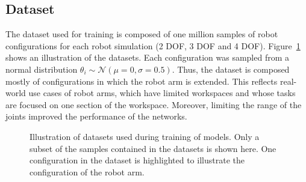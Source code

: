 \documentclass[conference]{IEEEtran}
\begin{document}
\subsection*{Dataset}
The dataset used for training is composed of one million samples of robot configurations for each robot simulation (2 DOF, 3 DOF and 4 DOF). Figure~\ref{fig:datasets} shows an illustration of the datasets. Each configuration was sampled from a normal distribution $ \theta_i \sim \mathcal{N}(\mu=0, \sigma=0.5) $. Thus, the dataset is composed mostly of configurations in which the robot arm is extended. This reflects real-world use cases of robot arms, which have limited workspaces and whose tasks are focused on one section of the workspace. Moreover, limiting the range of the joints improved the performance of the networks.

\begin{figure}[t]
    \centering
    \caption{Illustration of datasets used during training of models. Only a subset of the samples contained in the datasets is shown here. One configuration in the dataset is highlighted to illustrate the configuration of the robot arm.}
    \label{fig:datasets}
\end{figure}
\end{document}
